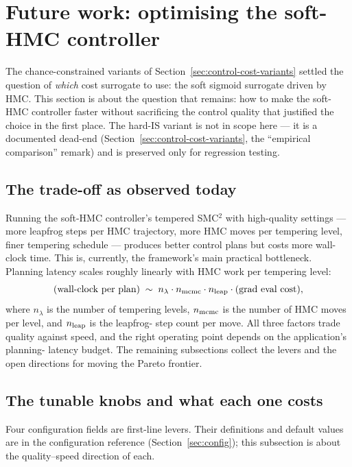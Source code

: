 \section{Future work: optimising the soft-HMC controller}
\label{sec:future-work}

The chance-constrained variants of Section~\ref{sec:control-cost-variants}
settled the question of \emph{which} cost surrogate to use: the soft
sigmoid surrogate driven by HMC. This section is about the question
that remains: how to make the soft-HMC controller faster without
sacrificing the control quality that justified the choice in the
first place. The hard-IS variant is not in scope here --- it is a
documented dead-end (Section~\ref{sec:control-cost-variants}, the
``empirical comparison'' remark) and is preserved only for regression
testing.

\subsection{The trade-off as observed today} \label{sec:fw-tradeoff}

Running the soft-HMC controller's tempered SMC$^2$ with high-quality
settings --- more leapfrog steps per HMC trajectory, more HMC moves
per tempering level, finer tempering schedule --- produces better
control plans but costs more wall-clock time. This is, currently, the
framework's main practical bottleneck. Planning latency scales
roughly linearly with HMC work per tempering level:
\[
\text{(wall-clock per plan)}
\;\sim\; n_\lambda \cdot n_{\rm mcmc} \cdot n_{\rm leap}
\cdot \text{(grad eval cost)},
\]
where $n_\lambda$ is the number of tempering levels, $n_{\rm mcmc}$ is
the number of HMC moves per level, and $n_{\rm leap}$ is the leapfrog-
step count per move. All three factors trade quality against speed,
and the right operating point depends on the application's planning-
latency budget. The remaining subsections collect the levers and the
open directions for moving the Pareto frontier.

\subsection{The tunable knobs and what each one costs} \label{sec:fw-knobs}

Four configuration fields are first-line levers. Their definitions and
default values are in the configuration reference (Section~\ref{sec:config});
this subsection is about the quality--speed direction of each.

